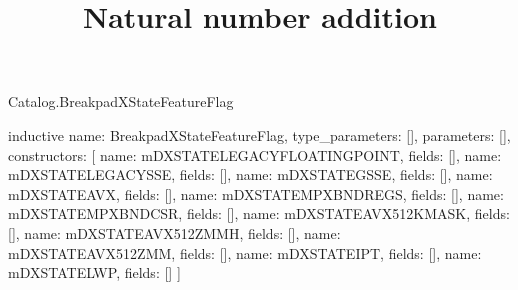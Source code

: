 \begin{lexlean}{Catalog.BreakpadXStateFeatureFlag}
\title{Natural number addition}
\begin{semanticmodule}
inductive{
  name: BreakpadXStateFeatureFlag,
  type_parameters: [],
  parameters: [],
  constructors: [
    {name: mDXSTATELEGACYFLOATINGPOINT, fields: []},
    {name: mDXSTATELEGACYSSE, fields: []},
    {name: mDXSTATEGSSE, fields: []},
    {name: mDXSTATEAVX, fields: []},
    {name: mDXSTATEMPXBNDREGS, fields: []},
    {name: mDXSTATEMPXBNDCSR, fields: []},
    {name: mDXSTATEAVX512KMASK, fields: []},
    {name: mDXSTATEAVX512ZMMH, fields: []},
    {name: mDXSTATEAVX512ZMM, fields: []},
    {name: mDXSTATEIPT, fields: []},
    {name: mDXSTATELWP, fields: []}
  ]
}
\end{semanticmodule}
\end{lexlean}
